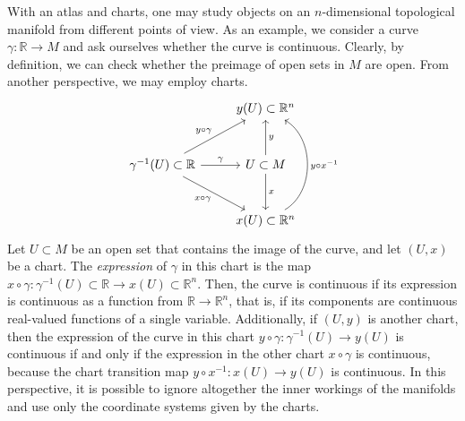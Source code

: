 With an atlas and charts, one may study objects on an \(n\)-dimensional topological manifold  from different points of view. As an example, we consider a curve \(\gamma : \mathbb{R} \to M\) and ask ourselves whether the curve is continuous. Clearly, by definition, we can check whether the preimage of open sets in \(M\) are open. From another perspective, we may employ charts.
\begin{equation*}
    \begin{tikzcd}[column sep = normal, row sep = large]
        & y(U) \subset \mathbb{R}^n \\
        \gamma^{-1}(U) \subset \mathbb{R} \arrow{r}{\gamma} \arrow{ur}{y\circ \gamma} \arrow[swap]{dr}{x\circ \gamma} &  U \subset M\arrow[swap]{u}{y} \arrow{d}{x}\\
        & x(U) \subset \mathbb{R}^n \arrow[bend right = 60, swap]{uu}{y\circ x^{-1}}
    \end{tikzcd}
\end{equation*}
Let \(U \subset M\) be an open set that contains the image of the curve, and let \((U, x)\) be a chart. The \emph{expression} of \(\gamma\) in this chart is the map \(x\circ \gamma: \gamma^{-1}(U) \subset \mathbb{R} \to x(U) \subset \mathbb{R}^n\). Then, the curve is continuous if its expression is continuous as a function from \(\mathbb{R} \to \mathbb{R}^n\), that is, if its components are continuous real-valued functions of a single variable. Additionally, if \((U, y)\) is another chart, then the expression of the curve in this chart \(y \circ \gamma : \gamma^{-1}(U) \to y(U)\) is continuous if and only if the expression in the other chart \(x\circ \gamma\) is continuous, because the chart transition map \(y\circ x^{-1} : x(U) \to y(U)\) is continuous. In this perspective, it is possible to ignore altogether the inner workings of the manifolds and use only the coordinate systems given by the charts.

